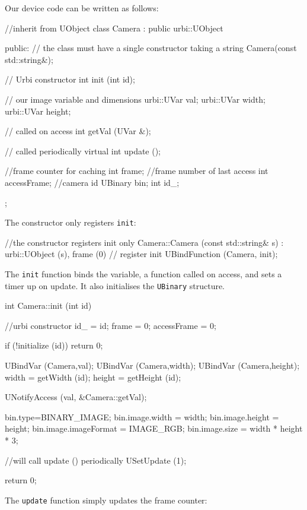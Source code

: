 Our device code can be written as follows:

\begin{urbiscript}
//inherit from UObject
class Camera : public urbi::UObject
{
public:
  // the class must have a single constructor taking a string
  Camera(const std::string&);

  // Urbi constructor
  int init (int id);

  // our image variable and dimensions
  urbi::UVar val;
  urbi::UVar width;
  urbi::UVar height;

  // called on access
  int getVal (UVar &);

  // called periodically
  virtual int update ();

  //frame counter for caching
  int frame;
  //frame number of last access
  int accessFrame;
  //camera id UBinary bin;
  int id_;
};
\end{urbiscript}

The constructor only registers \lstinline{init}:

\begin{urbiscript}
//the constructor registers init only
Camera::Camera (const std::string& s)
  : urbi::UObject (s),
    frame (0)
{
  // register init
  UBindFunction (Camera, init);
}
\end{urbiscript}

The \lstinline{init} function binds the variable, a function called on
access, and sets a timer up on update. It also initialises the
\lstinline{UBinary} structure.

\begin{urbiscript}
int
Camera::init (int id)
{
  //urbi constructor
  id_ = id;
  frame = 0;
  accessFrame = 0;

  if (!initialize (id))
    return 0;

  UBindVar (Camera,val);
  UBindVar (Camera,width);
  UBindVar (Camera,height);
  width = getWidth (id);
  height = getHeight (id);

  UNotifyAccess (val, &Camera::getVal);

  bin.type=BINARY_IMAGE;
  bin.image.width = width;
  bin.image.height = height;
  bin.image.imageFormat = IMAGE_RGB;
  bin.image.size = width * height * 3;

  //will call update () periodically
  USetUpdate (1);

  return 0;
}
\end{urbiscript}

The \lstinline{update} function simply updates the frame counter:

